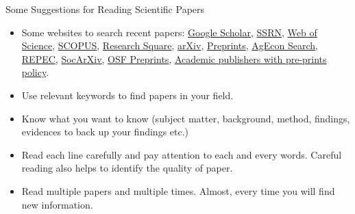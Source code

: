 \documentclass[11pt]{beamer}
\begin{document}
\begin{frame}{Some Suggestions for Reading Scientific Papers}
	\begin{itemize}
    \item Some websites to search recent papers: {\color{blue}\href{https://scholar.google.com/}{Google Scholar}}, {\color{blue}\href{https://www.ssrn.com/index.cfm/en/}{SSRN}}, {\color{blue}\href{https://clarivate.libguides.com/directlinks}{Web of Science}}, {\color{blue}\href{https://www.researchsquare.com/}{SCOPUS}}, {\color{blue}\href{https://www.researchsquare.com/}{Research Square}}, {\color{blue}\href{https://arxiv.org/}{arXiv}}, {\color{blue}\href{https://www.preprints.org/}{Preprints}}, {\color{blue}\href{https://ageconsearch.umn.edu/?ln=en}{AgEcon Search}}, {\color{blue}\href{http://repec.org/}{REPEC}}, {\color{blue}\href{https://osf.io/preprints/socarxiv/}{SocArXiv}}, {\color{blue}\href{https://osf.io/preprints/}{OSF Preprints}}, {\color{blue}\href{https://en.wikipedia.org/wiki/List_of_academic_publishers_by_preprint_policy}{Academic publishers with pre-prints policy}}.
    \item Use relevant keywords to find papers in your field.
	\item Know what you want to know (subject matter, background, method, findings, evidences to back up your findings etc.)
    \item Read each line carefully and pay attention to each and every words. Careful reading also helps to identify the quality of paper.
    \item Read multiple papers and multiple times. Almost, every time you will find new information.
	\end{itemize}
\end{frame}
\end{document}
